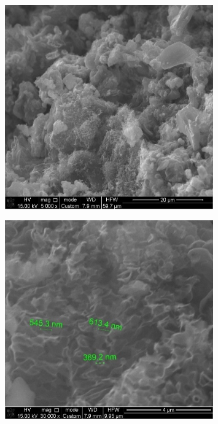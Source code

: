 \begin{figure}[H]
	\centering
	\includegraphics[width=0.8\textwidth]{media/chem2/image19}
	\caption*{}
\end{figure}

\begin{figure}[H]
	\centering
	\includegraphics[width=0.8\textwidth]{media/chem2/image20}
	\caption*{}
\end{figure}

